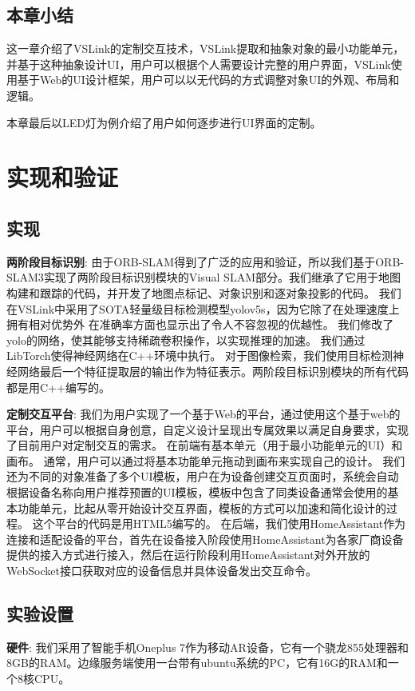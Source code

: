 \section{本章小结}
这一章介绍了VSLink的定制交互技术，VSLink提取和抽象对象的最小功能单元，并基于这种抽象设计UI，用户可以根据个人需要设计完整的用户界面，VSLink使用基于Web的UI设计框架，用户可以以无代码的方式调整对象UI的外观、布局和逻辑。

本章最后以LED灯为例介绍了用户如何逐步进行UI界面的定制。

\chapter{实现和验证}
\label{chap:eval}
\section{实现}
\textbf{两阶段目标识别}: 由于ORB-SLAM得到了广泛的应用和验证，所以我们基于ORB-SLAM3\cite{CamElvRod20}实现了两阶段目标识别模块的Visual SLAM部分。我们继承了它用于地图构建和跟踪的代码，并开发了地图点标记、对象识别和逐对象投影的代码。
我们在VSLink中采用了SOTA轻量级目标检测模型yolov5s\cite{glenn_jocher_2020_4154370}，因为它除了在处理速度上拥有相对优势外 在准确率方面也显示出了令人不容忽视的优越性。
我们修改了yolo的网络，使其能够支持稀疏卷积操作\cite{ren2018sbnet}，以实现推理的加速。
我们通过LibTorch使得神经网络在C++环境中执行。
对于图像检索，我们使用目标检测神经网络最后一个特征提取层的输出\cite{glenn_jocher_2020_4154370}作为特征表示。两阶段目标识别模块的所有代码都是用C++编写的。

\textbf{定制交互平台}: 我们为用户实现了一个基于Web的平台，通过使用这个基于web的平台，用户可以根据自身创意，自定义设计呈现出专属效果以满足自身要求，实现了目前用户对定制交互的需求。
在前端有基本单元（用于最小功能单元的UI）和画布。
通常，用户可以通过将基本功能单元拖动到画布来实现自己的设计。
我们还为不同的对象准备了多个UI模板，用户在为设备创建交互页面时，系统会自动根据设备名称向用户推荐预置的UI模板，模板中包含了同类设备通常会使用的基本功能单元，比起从零开始设计交互界面，模板的方式可以加速和简化设计的过程。
这个平台的代码是用HTML5编写的。
在后端，我们使用HomeAssistant\cite{homeass}作为连接和适配设备的平台，首先在设备接入阶段使用HomeAssistant为各家厂商设备提供的接入方式进行接入，然后在运行阶段利用HomeAssistant对外开放的WebSocket接口获取对应的设备信息并具体设备发出交互命令。
\section{实验设置}
\textbf{硬件}: 我们采用了智能手机Oneplus 7作为移动AR设备，它有一个骁龙855处理器和8GB的RAM。边缘服务端使用一台带有ubuntu系统的PC，它有16G的RAM和一个8核CPU。


